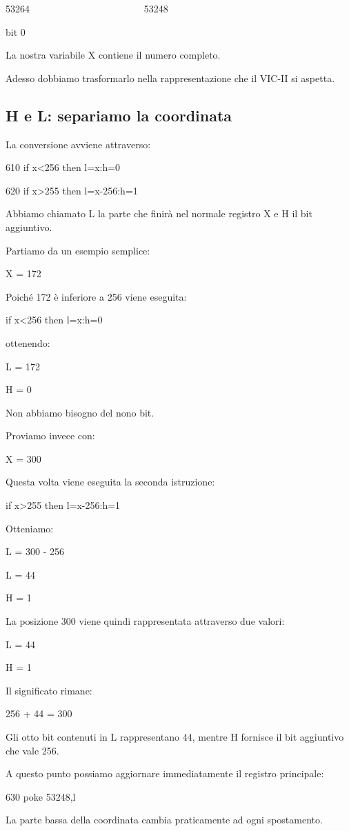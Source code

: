 \documentclass{article}
\begin{document}
53264 \ \ \ \ \ \ \ \ \ \ \ \ \ \ \ \ \ \ \ \ \ \ \ 53248

bit 0

La nostra variabile X contiene il numero completo.

Adesso dobbiamo trasformarlo nella rappresentazione che il VIC-II si aspetta.

\subsection{H e L: separiamo la coordinata}
La conversione avviene attraverso:

610 if x{\textless}256 then l=x:h=0

620 if x{\textgreater}255 then l=x-256:h=1

Abbiamo chiamato L la parte che finirà nel normale registro X e H il bit aggiuntivo.

Partiamo da un esempio semplice:

X = 172

Poiché 172 è inferiore a 256 viene eseguita:

if x{\textless}256 then l=x:h=0

ottenendo:

L = 172

H = 0

Non abbiamo bisogno del nono bit.

Proviamo invece con:

X = 300

Questa volta viene eseguita la seconda istruzione:

if x{\textgreater}255 then l=x-256:h=1

Otteniamo:

L = 300 - 256

L = 44


\bigskip

H = 1

La posizione 300 viene quindi rappresentata attraverso due valori:

L = 44

H = 1

Il significato rimane:

256 + 44 = 300

Gli otto bit contenuti in L rappresentano 44, mentre H fornisce il bit aggiuntivo che vale 256.

A questo punto possiamo aggiornare immediatamente il registro principale:

630 poke 53248,l

La parte bassa della coordinata cambia praticamente ad ogni spostamento.
\end{document}

